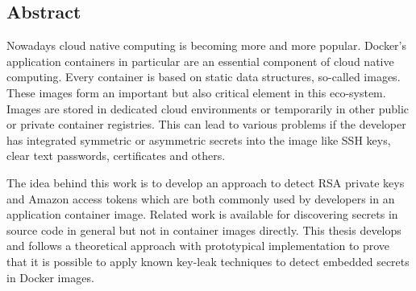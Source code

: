 
\begin{otherlanguage}{american}
\chapter*{Abstract}
Nowadays cloud native computing is becoming more and more popular. 
Docker's application containers in particular are an essential component of cloud native computing. 
Every container is based on static data structures, so-called images. 
These images form an important but also critical element in this eco-system.
Images are stored in dedicated cloud environments or temporarily in other public or private container registries. 
This can lead to various problems if the developer has integrated symmetric or asymmetric secrets into the image like SSH keys, clear text passwords, certificates and others.

The idea behind this work is to develop an approach to detect RSA private keys and Amazon access tokens which are both commonly used by developers in an application container image. Related work is available for discovering secrets in source code in general but not in container images directly. This thesis develops and follows a theoretical approach with prototypical implementation to prove that it is possible to apply known key-leak techniques to detect embedded secrets in Docker images.
\end{otherlanguage}